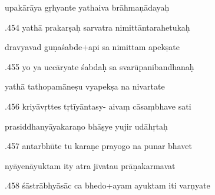 \documentclass[article,12pt,a4paper]{memoir}%
\newcounter{parCount}
\begin{document}
	  
	  \pstart \leavevmode%
	upakārāya gṛhyante yathaiva brāhmaṇādayaḥ 
	{}
	\pend%
      

	  
	  \pstart {}.454 yathā prakarṣaḥ sarvatra   nimittāntarahetukaḥ 
	{}
	\pend%
      

	  
	  \pstart \leavevmode%
	dravyavad guṇaśabde+api sa nimittam apekṣate 
	{}
	\pend%
      

	  
	  \pstart {}.455 yo ya uccāryate śabdaḥ sa svarūpanibandhanaḥ 
	{}
	\pend%
      

	  
	  \pstart \leavevmode%
	yathā tathopamāneṣu vyapekṣa na nivartate 
	{}
	\pend%
      

	  
	  \pstart {}.456 kriyāvṛttes tṛtīyāntasy- aivaṃ cāsaṃbhave sati 
	{}
	\pend%
      

	  
	  \pstart \leavevmode%
	prasiddhanyāyakaraṇo bhāṣye yujir udāhṛtaḥ 
	{}
	\pend%
      

	  
	  \pstart {}.457 antarbhūte tu karaṇe prayogo na punar bhavet 
	{}
	\pend%
      

	  
	  \pstart \leavevmode%
	nyāyenāyuktam ity atra jīvatau prāṇakarmavat 
	{}
	\pend%
      

	  
	  \pstart {}.458 śāstrābhyāsāc ca bhedo+ayam ayuktam iti varṇyate 
	{}
	\pend%
      
\end{document}
